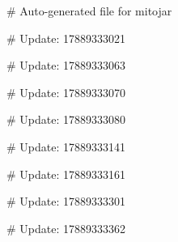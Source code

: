# Auto-generated file for mitojar

# Update: 17889333021

# Update: 17889333063

# Update: 17889333070

# Update: 17889333080

# Update: 17889333141

# Update: 17889333161

# Update: 17889333301

# Update: 17889333362
